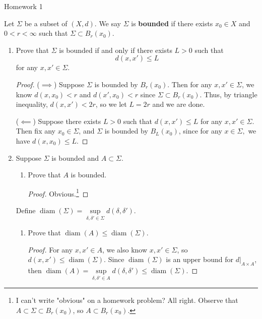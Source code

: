 \documentclass[12pt,letterpaper]{article}
\DeclareMathOperator{\diameter}{diam}
\newcommand{\diam}[1]{\diameter\left(#1\right)}
\begin{document}
\thispagestyle{fancy}
\begin{center}
{\Large Homework 1 \\ }%
\end{center}

\begin{definition*}
Let $\Sigma$ be a subset of $(X,d)$. We say $\Sigma$ is \textbf{bounded} if there exists $x_0\in X$ and $0<r<\infty$ such that $\Sigma\subset B_r(x_0)$. 
\end{definition*}

\begin{enumerate}
\item Prove that $\Sigma$ is bounded if and only if there exists $L>0$ such that
$$d(x,x')\leq L$$
for any $x, x'\in\Sigma$.
\begin{proof}($\implies$) Suppose $\Sigma$ is bounded by $B_r(x_0)$. Then for any $x,x'\in\Sigma$, we know $d(x,x_0)<r$ and $d(x',x_0)<r$ since $\Sigma\subset B_r(x_0)$. Thus, by triangle inequality, $d(x,x')<2r$, so we let $L=2r$ and we are done. \qedwhite

($\impliedby$) Suppose there exists $L>0$ such that $d(x,x')\leq L$ for any $x, x'\in\Sigma$. Then fix any $x_0\in\Sigma$, and $\Sigma$ is bounded by $B_L(x_0)$, since for any $x\in\Sigma,$ we have $d(x,x_0)\leq L$. 
\end{proof}

\item Suppose $\Sigma$ is bounded and $A\subset\Sigma$. 
\begin{enumerate}
\item Prove that $A$ is bounded. 
\begin{proof}
Obvious.\footnote{I can't write "obvious" on a homework problem? All right. Observe that $A\subset\Sigma\subset B_r(x_0)$, so $A\subset B_r(x_0)$.}
\end{proof}
\end{enumerate}
\begin{definition*}
Define $\diam{\Sigma} = \sup\limits_{\delta, \delta'\in\Sigma} d(\delta, \delta')$.
\end{definition*}
\begin{enumerate}[resume]
\item Prove that $\diam{A}\leq\diam{\Sigma}$. 
\begin{proof}
For any $x,x'\in A$, we also know $x,x'\in\Sigma$, so $d(x,x')\leq\diam{\Sigma}$. Since $\diam{\Sigma}$ is an upper bound for $d|_{A\times A}$, then $\diam{A}=\sup\limits_{\delta, \delta'\in A} d(\delta, \delta') \leq \diam{\Sigma}$. 
\end{proof}
\end{enumerate}


\end{enumerate}
\end{document}
